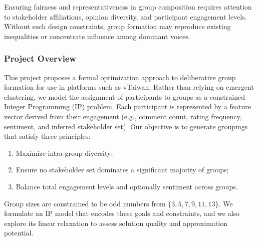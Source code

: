 Ensuring fairness and representativeness in group composition requires attention to stakeholder affiliations,
opinion diversity, and participant engagement levels.
Without such design constraints, group formation may reproduce existing inequalities
or concentrate influence among dominant voices.

\subsubsection*{Project Overview}

This project proposes a formal optimization approach to deliberative group formation
for use in platforms such as vTaiwan.
Rather than relying on emergent clustering, we model the assignment
of participants to groups as a constrained Integer Programming (IP) problem.
Each participant is represented by a feature vector derived from their engagement
(e.g., comment count, rating frequency, sentiment, and inferred stakeholder set).
Our objective is to generate groupings that satisfy three principles:
\begin{enumerate}
  \item Maximize intra-group diversity;
  \item Ensure no stakeholder set dominates a significant majority of groups;
  \item Balance total engagement levels and optionally sentiment across groups.
\end{enumerate}
Group sizes are constrained to be odd numbers from $\{3,5,7,9,11,13\}$.
We formulate an IP model that encodes these goals and constraints,
and we also explore its linear relaxation to assess solution quality and approximation potential.
